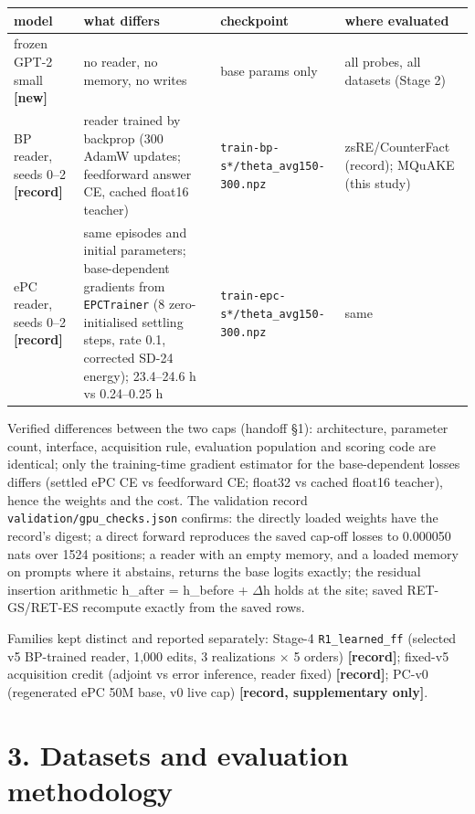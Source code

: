\documentclass[10pt,a4paper]{article}
\begin{document}
\begin{center}\footnotesize
\begin{tabularx}{\textwidth}{@{}p{}XXX@{}}
\toprule
model & what differs & checkpoint & where evaluated \\ \midrule
frozen GPT-2 small \textbf{[new]} & no reader, no memory, no writes & base params only & all probes, all datasets (Stage 2) \\
BP reader, seeds 0–2 \textbf{[record]} & reader trained by backprop (300 AdamW updates; feedforward answer CE, cached float16 teacher) & \texttt{train-bp-s*/theta\_avg150-300.npz} & zsRE/CounterFact (record); MQuAKE (this study) \\
ePC reader, seeds 0–2 \textbf{[record]} & same episodes and initial parameters; base-dependent gradients from \texttt{EPCTrainer} (8 zero-initialised settling steps, rate 0.1, corrected SD-24 energy); 23.4–24.6 h vs 0.24–0.25 h & \texttt{train-epc-s*/theta\_avg150-300.npz} & same \\
\bottomrule
\end{tabularx}
\end{center}



Verified differences between the two caps (handoff §1): architecture, parameter count, interface, acquisition rule, evaluation population and scoring code are identical; only the training-time gradient estimator for the base-dependent losses differs (settled ePC CE vs feedforward CE; float32 vs cached float16 teacher), hence the weights and the cost. The validation record \texttt{validation/gpu\_checks.json} confirms: the directly loaded weights have the record's digest; a direct forward reproduces the saved cap-off losses to 0.000050 nats over 1524 positions; a reader with an empty memory, and a loaded memory on prompts where it abstains, returns the base logits exactly; the residual insertion arithmetic h\_after = h\_before + $\Delta$h holds at the site; saved RET-GS/RET-ES recompute exactly from the saved rows.



Families kept distinct and reported separately: Stage-4 \texttt{R1\_learned\_ff} (selected v5 BP-trained reader, 1,000 edits, 3 realizations $\times$ 5 orders) \textbf{[record]}; fixed-v5 acquisition credit (adjoint vs error inference, reader fixed) \textbf{[record]}; PC-v0 (regenerated ePC 50M base, v0 live cap) \textbf{[record, supplementary only]}.



\section*{3. Datasets and evaluation methodology}
\end{document}
